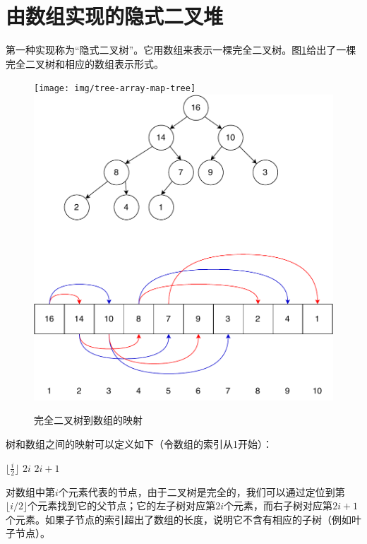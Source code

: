 \documentclass[b5paper]{ctexart}
\begin{document}
\section{由数组实现的隐式二叉堆}
\label{ibheap} 

第一种实现称为“隐式二叉树”。它用数组来表示一棵完全二叉树。图\ref{fig:tree-array-map}给出了一棵完全二叉树和相应的数组表示形式。

\begin{figure}[htbp]
\centering
   \texttt{[image: img/tree-array-map-tree]}
   \includegraphics[scale=0.5]{img/binary-tree-in-array}
 \caption{完全二叉树到数组的映射} \label{fig:tree-array-map}
\end{figure}

树和数组之间的映射可以定义如下（令数组的索引从1开始）：

\begin{algorithmic}[1]
  \State \Return $\lfloor \frac{i}{2} \rfloor$
\EndFunction
\Statex
{}
  \State \Return $2i$
\EndFunction
\Statex
{}
  \State \Return $2i+1$
\EndFunction
\end{algorithmic}

对数组中第$i$个元素代表的节点，由于二叉树是完全的，我们可以通过定位到第$\lfloor i/2 \rfloor$个元素找到它的父节点；它的左子树对应第$2i$个元素，而右子树对应第$2i+1$个元素。如果子节点的索引超出了数组的长度，说明它不含有相应的子树（例如叶子节点）。
\end{document}
